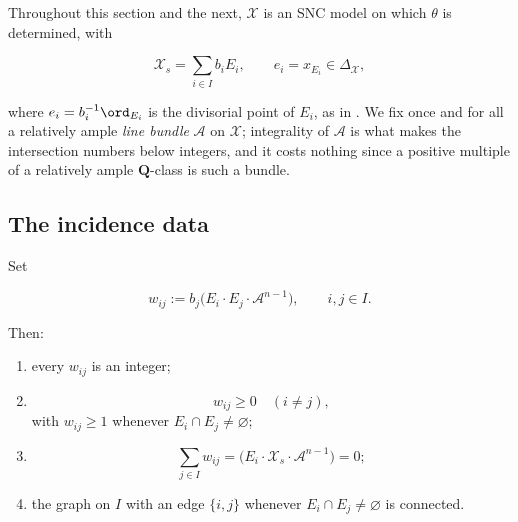 Throughout this section and the next, $\mathcal X$ is an SNC model on which
$\theta$ is determined, with

\[
            \mathcal X_s=\sum_{i\in I}b_iE_i,
            \qquad e_i=x_{E_i}\in\Delta_{\mathcal X},
\tag{22.20}\label{eq:ch22-vertices}
\]

where $e_i=b_i^{-1}\ord_{E_i}$ is the divisorial point of $E_i$, as in
.  We fix once and for all a relatively
ample \emph{line bundle} $\mathcal A$ on $\mathcal X$; integrality of
$\mathcal A$ is what makes the intersection numbers below integers, and it
costs nothing since a positive multiple of a relatively ample
$\mathbf Q$-class is such a bundle.

\subsection{The incidence data}

\begin{lemma}
\label{lem:ch22-incidence-signs}
Set

\[
 w_{ij}:=b_j\bigl(E_i\cdot E_j\cdot\mathcal A^{n-1}\bigr),
 \qquad i,j\in I .
\tag{22.21}\label{eq:ch22-incidence-weights}
\]

Then:
\begin{enumerate}
\item\label{itm:ch22-inc:integrality} every $w_{ij}$ is an integer;
\item\label{itm:ch22-inc:offdiag}
\[
 w_{ij}\geq0\quad(i\neq j),
\tag{22.22}\label{eq:ch22-off-diagonal-positive}
\]
with $w_{ij}\geq1$ whenever $E_i\cap E_j\neq\varnothing$;
\item\label{itm:ch22-inc:rowsum}
\[
 \sum_{j\in I}w_{ij}
       =\bigl(E_i\cdot\mathcal X_s\cdot\mathcal A^{n-1}\bigr)=0;
\tag{22.23}\label{eq:ch22-row-sum-zero}
\]
\item\label{itm:ch22-inc:connected} the graph on $I$ with an edge
$\{i,j\}$ whenever $E_i\cap E_j\neq\varnothing$ is connected.
\end{enumerate}
\end{lemma}

